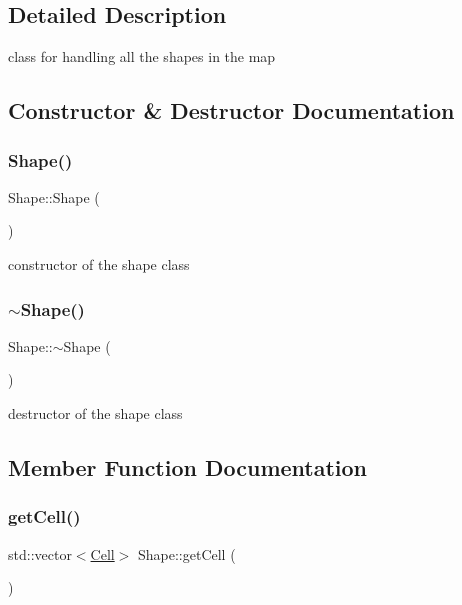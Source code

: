 \subsection{Detailed Description}
class for handling all the shapes in the map 

\subsection{Constructor \& Destructor Documentation}
\mbox{\label{class_shape_aaa8d87171e65e0d8ba3c5459978992a7}} 
\subsubsection{\texorpdfstring{Shape()}{Shape()}}
{\footnotesize\ttfamily Shape\+::\+Shape (\begin{DoxyParamCaption}{ }\end{DoxyParamCaption})}

constructor of the shape class \mbox{\label{class_shape_a935afc9e576015f967d90de56977167d}} 
\subsubsection{\texorpdfstring{$\sim$\+Shape()}{~Shape()}}
{\footnotesize\ttfamily Shape\+::$\sim$\+Shape (\begin{DoxyParamCaption}{ }\end{DoxyParamCaption})}

destructor of the shape class 

\subsection{Member Function Documentation}
\mbox{\label{class_shape_ad1951cad2df16392cab74b472020b851}} 
\subsubsection{\texorpdfstring{get\+Cell()}{getCell()}}
{\footnotesize\ttfamily std\+::vector$<$\mbox{\hyperlink{class_cell}{Cell}}$>$ Shape\+::get\+Cell (\begin{DoxyParamCaption}{ }\end{DoxyParamCaption})}

